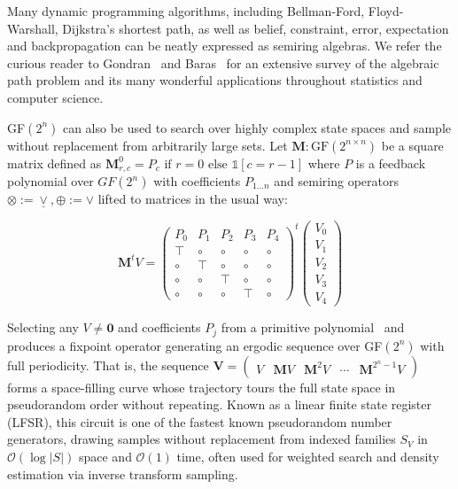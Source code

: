 \documentclass[sigplan,10pt,review,anonymous]{acmart}
\begin{document}
\noindent Many dynamic programming algorithms, including Bellman-Ford, Floyd-Warshall, Dijkstra's shortest path, as well as belief, constraint, error, expectation and backpropagation can be neatly expressed as semiring algebras. We refer the curious reader to Gondran~\citep{gondran2008graphs} and Baras~\citep{baras2010path} for an extensive survey of the algebraic path problem and its many wonderful applications throughout statistics and computer science.

GF$(2^n)$ can also be used to search over highly complex state spaces and sample without replacement from arbitrarily large sets. Let $\textbf{M}: \text{GF}(2^{n\times n})$ be a square matrix defined as $\mathbf{M}^0_{r, c} = P_c \text{ if } r=0 \text{ else } \mathds{1}[c = r - 1]$ where $P$ is a feedback polynomial over $GF(2^n)$ with coefficients $P_{1\ldots n}$ and semiring operators $\otimes := \underline{\vee}, \oplus := \vee$ lifted to matrices in the usual way:

\vspace{-7}
\[
\mathbf{M}^tV = \begin{pmatrix}
  P_0 & P_1 & P_2 & P_3 & P_4 \\
  \top & \circ & \circ & \circ & \circ \\
  \circ & \top & \circ & \circ & \circ \\
  \circ & \circ & \top & \circ & \circ \\
  \circ & \circ & \circ & \top & \circ
\end{pmatrix}^t
\begin{pmatrix}
      V_0 \\
      V_1 \\
      V_2 \\
      V_3 \\
      V_4
\end{pmatrix}
\]

Selecting any $V \neq \mathbf{0}$ and coefficients $P_j$ from a primitive polynomial~\citep{saxena2004primitive} and produces a fixpoint operator generating an ergodic sequence over GF$(2^n)$ with full periodicity. That is, the sequence $\mathbf{V} = \begin{pmatrix}V & \mathbf{M}V & \mathbf{M}^{2}V & \cdots & \mathbf{M}^{2^n-1}V \end{pmatrix}$ forms a space-filling curve whose trajectory tours the full state space in pseudorandom order without repeating. Known as a linear finite state register (LFSR), this circuit is one of the fastest known pseudorandom number generators, drawing samples without replacement from indexed families $S_V$ in $\mathcal{O}(\log |S|)$ space and $\mathcal{O}(1)$ time, often used for weighted search and density estimation via inverse transform sampling.
\end{document}
